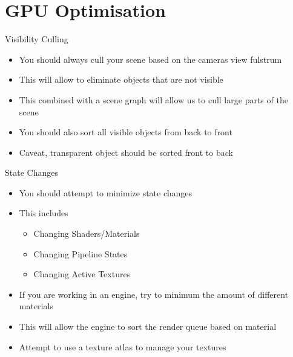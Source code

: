 \part{GPU Optimisation}
\frame{\partpage}

\begin{frame}{Visibility Culling}
\begin{itemize}
	\pause \item You should always cull your scene based on the cameras view fulstrum
	\pause \item This will allow to eliminate objects that are not visible
	\pause \item This combined with a scene graph will allow us to cull large parts of the scene
	\pause \item You should also sort all visible objects from back to front
	\pause \item Caveat, transparent object should be sorted front to back   
\end{itemize}
\end{frame}

\begin{frame}{State Changes}
	\begin{itemize}
		\pause \item You should attempt to minimize state changes
		\pause \item This includes
		\begin{itemize}
			\pause \item Changing Shaders/Materials
			\pause \item Changing Pipeline States
			\pause \item Changing Active Textures
		\end{itemize} 
		\pause \item If you are working in an engine, try to minimum the amount of different materials
		\pause \item This will allow the engine to sort the render queue based on material
		\pause \item Attempt to use a texture atlas to manage your textures
	\end{itemize}
\end{frame}

